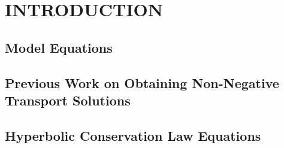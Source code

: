 \chapter{INTRODUCTION}

\section{Model Equations}
  
\section{Previous Work on Obtaining Non-Negative Transport Solutions}
  
\section{Hyperbolic Conservation Law Equations}
  
